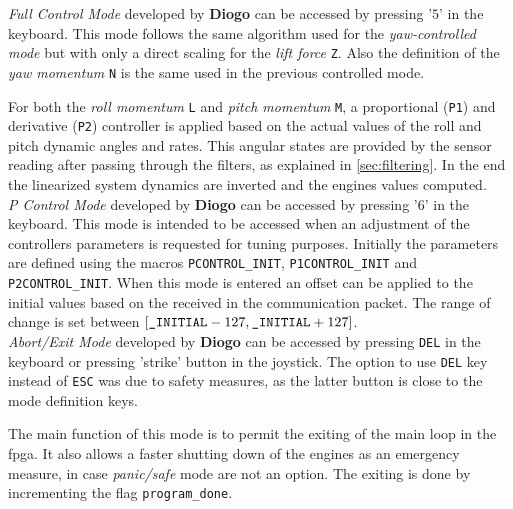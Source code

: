 \documentclass{article}
\begin{document}
\textit{Full Control Mode} developed by \textbf{Diogo} can be accessed by pressing '$5$' in the keyboard. This mode follows the same algorithm used for the \textit{yaw-controlled mode} but with only a direct scaling for the \textit{lift force} \texttt{Z}. Also the definition of the \textit{yaw momentum} \texttt{N} is the same used in the previous controlled mode. 

For both the \textit{roll momentum} \texttt{L} and \textit{pitch momentum} \texttt{M}, a proportional (\texttt{P1}) and derivative (\texttt{P2}) controller is applied based on the actual values of the roll and pitch dynamic angles and rates. This angular states are provided by the sensor reading after passing through the filters, as explained in \ref{sec:filtering}. In the end the linearized system dynamics are inverted and the engines values computed.\\

\textit{P Control Mode} developed by \textbf{Diogo} can be accessed by pressing '$6$' in the keyboard. This mode is intended to be accessed when an adjustment of the controllers parameters is requested for tuning purposes. Initially the parameters are defined using the macros \texttt{PCONTROL\_INIT}, \texttt{P1CONTROL\_INIT} and \texttt{P2CONTROL\_INIT}. When this mode is entered an offset can be applied to the initial values based on the received in the communication packet. The range of change is set between $[\text{\texttt{\_INITIAL}}-127,\text{\texttt{\_INITIAL}}+127]$.\\

\textit{Abort/Exit Mode} developed by \textbf{Diogo} can be accessed by pressing \texttt{DEL} in the keyboard or pressing 'strike' button in the joystick. The option to use \texttt{DEL} key instead of \texttt{ESC} was due to safety measures, as the latter button is close to the mode definition keys. 

The main function of this mode is to permit the exiting of the main loop in the fpga. It also allows a faster shutting down of the engines as an emergency measure, in case \textit{panic/safe} mode are not an option. The exiting is done by incrementing the flag \texttt{program\_done}.

\end{document}
